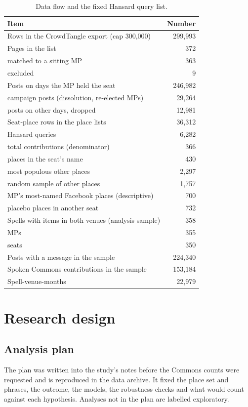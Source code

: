 \documentclass[11pt,a4paper]{article}
\begin{document}
\begin{table}[tbp]\centering\small\caption{Data flow and the fixed Hansard query list.}\label{tab:sample}\begin{tabular}{lr}\toprule Item & Number\\\midrule
Rows in the CrowdTangle export (cap 300,000) & 299,993\\
Pages in the list & 372\\
\quad matched to a sitting MP & 363\\
\quad excluded & 9\\
Posts on days the MP held the seat & 246,982\\
\quad campaign posts (dissolution, re-elected MPs) & 29,264\\
\quad posts on other days, dropped & 12,981\\
Seat-place rows in the place lists & 36,312\\\midrule
Hansard queries & 6,282\\
\quad total contributions (denominator) & 366\\
\quad places in the seat's name & 430\\
\quad most populous other places & 2,297\\
\quad random sample of other places & 1,757\\
\quad MP's most-named Facebook places (descriptive) & 700\\
\quad placebo places in another seat & 732\\\midrule
Spells with items in both venues (analysis sample) & 358\\
\quad MPs & 355\\
\quad seats & 350\\
Posts with a message in the sample & 224,340\\
Spoken Commons contributions in the sample & 153,184\\
Spell-venue-months & 22,979\\\bottomrule\end{tabular}\end{table}

\section{Research design}\label{sec:design}
\subsection{Analysis plan}
The plan was written into the study's notes before the Commons counts were requested and is reproduced in the data archive. It fixed the place set and phrases, the outcome, the models, the robustness checks and what would count against each hypothesis. Analyses not in the plan are labelled exploratory.
\end{document}
